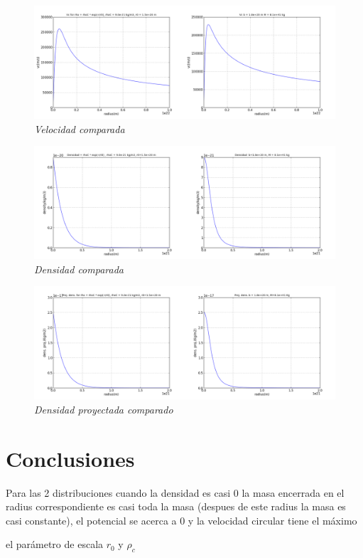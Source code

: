 \documentclass[12pt]{book}
\begin{document}
\begin{description}
\item 
\begin{figure}[!ht]
 \centering
 \includegraphics[scale=0.3]{vcAnComp.png}
 \caption{\emph{Velocidad comparada}}
\end{figure}


\item 
\begin{figure}[!ht]
 \centering
 \includegraphics[scale=0.3]{densAnComp.png}
 \caption{\emph{Densidad comparada}}
\end{figure}

\item 
\begin{figure}[!ht]
 \centering
 \includegraphics[scale=0.3]{dpAnComp.png}
 \caption{\emph{Densidad proyectada comparado}}
\end{figure}

\end{description}


\section*{Conclusiones}
\begin{description}
\item Para las 2 distribuciones cuando la densidad es casi 0 la masa encerrada en el radius correspondiente es casi toda la masa (despues de este radius la masa es casi constante), el potencial se acerca a 0 y la velocidad circular tiene el máximo
\item el parámetro de escala $r_0$ y $\rho_c$
\end{description}
\end{document}
